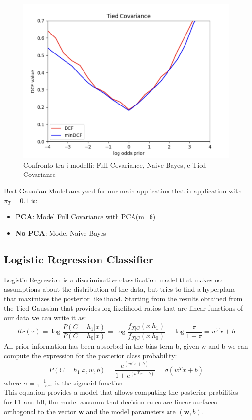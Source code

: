 \documentclass{article}
\begin{document}
\begin{figure}[H]
\begin{minipage}{.3\textwidth}
        \includegraphics[width=\linewidth]{./img/tied.png}
    \end{minipage}
    \caption{Confronto tra i modelli: Full Covariance, Naive Bayes, e Tied Covariance} %
    \label{fig:models_comparison} %
\end{figure}
Best Gaussian Model analyzed for our main application that is application with \(\pi_T=0.1\) is:
\begin{itemize}
    \item \textbf{PCA}: Model Full Covariance with PCA(m=6)
    \item \textbf{No PCA}: Model Naive Bayes 
\end{itemize}
\subsection{Logistic Regression Classifier}
Logistic Regression is a discriminative classification model that makes no assumptions about the distribution of the data, but tries to find a hyperplane that maximizes the posterior likelihood. 
Starting from the results obtained from the Tied Gaussian that provides log-likelihood ratios that are linear functions of our data we can write it as:
\begin{equation}
    llr(x) =\log{\frac{P(C=h_1|x)}{P(C=h_0|x)}}=\log{\frac{f_{X|C}(x|h_1)}{f_{X|C}(x|h_0)}}+\log{\frac{\pi}{1-\pi}}= w^Tx + b
\end{equation}
All prior information has been absorbed in the bias term b, given w and b we can compute the expression for the posterior class probability:
\begin{equation}
    P(C=h_1|x,w,b)=\frac{e^{(w^Tx+b)}}{1+e^{(w^Tx-b)}}=\sigma(w^Tx+b)
\end{equation}
where \(\sigma=\frac{1}{1-e^{-x}}\) is the sigmoid function.\\
This equation provides a model that allows computing the posterior prabilities for h1 and h0, the model assumes that decision rules are linear surfaces orthogonal to the vector \textbf{w} and the model parameters are \((\textbf{w},b)\).
\end{document}

